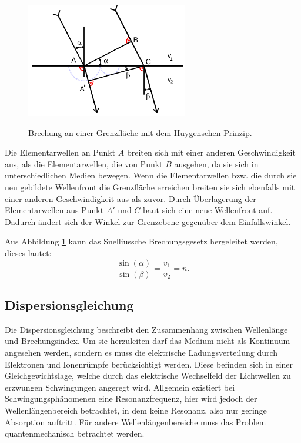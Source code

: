 \begin{figure}[H]
  \centering
  \includegraphics[height=5cm]{huygen.png}
  \caption{Brechung an einer Grenzfläche mit dem Huygenschen Prinzip.}
  \label{fig:huyg}
  \cite{skript}
\end{figure}

Die Elementarwellen an Punkt $A$ breiten sich mit einer anderen Geschwindigkeit
aus, als die Elementarwellen, die von Punkt $B$ ausgehen, da sie sich in
unterschiedlichen Medien bewegen. Wenn die Elementarwellen bzw. die
durch sie neu gebildete Wellenfront die Grenzfläche erreichen breiten sie sich
ebenfalls mit einer anderen Geschwindigkeit aus als zuvor. Durch Überlagerung
der Elementarwellen aus Punkt $A'$ und $C$ baut sich eine neue Wellenfront auf.
Dadurch ändert sich der Winkel zur Grenzebene gegenüber dem Einfallswinkel.

Aus Abbildung \ref{fig:huyg} kann das Snelliussche Brechungsgesetz hergeleitet werden,
dieses lautet:
\begin{equation}
  \frac{\sin{(\alpha)}}{\sin{(\beta)}}=\frac{v_1}{v_2}=n.
  \label{eqn:brechung}
\end{equation}

\subsection{Dispersionsgleichung}
Die Dispersionsgleichung beschreibt den Zusammenhang zwischen Wellenlänge
und Brechungsindex. Um sie herzuleiten darf das Medium nicht als Kontinuum
angesehen werden, sondern es muss die elektrische Ladungsverteilung durch
Elektronen und Ionenrümpfe berücksichtigt werden. Diese befinden sich in einer Gleichgewichtslage, welche
durch das elektrische Wechselfeld der Lichtwellen zu erzwungen Schwingungen
angeregt wird. Allgemein existiert bei Schwingungsphänomenen eine Resonanzfrequenz,
hier wird jedoch der Wellenlängenbereich betrachtet, in dem keine
Resonanz, also nur geringe Absorption auftritt. Für andere Wellenlängenbereiche
muss das Problem quantenmechanisch betrachtet werden.

